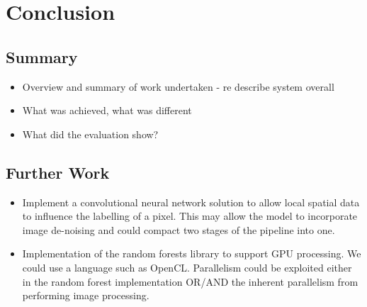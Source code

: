 \documentclass[12pt,twoside,notitlepage]{report}
\begin{document}


\cleardoublepage
\chapter{Conclusion}
  \section{Summary}
        \begin{itemize}
            \item Overview and summary of work undertaken - re describe system overall
            \item What was achieved, what was different
            \item What did the evaluation show?
        \end{itemize}

    \section{Further Work}
        \begin{itemize}
            \item Implement a convolutional neural network solution to allow local spatial data to influence the labelling of a pixel. This may allow the model to incorporate image de-noising and could compact two stages of the pipeline into one.
            \item Implementation of the random forests library to support GPU processing. We could use a language such as OpenCL. Parallelism could be exploited either in the random forest implementation OR/AND the inherent parallelism from performing image processing.
        \end{itemize}











\cleardoublepage
{}

\cleardoublepage
\end{document}
